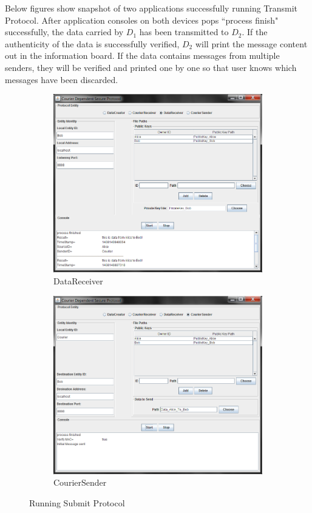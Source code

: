 Below figures show snapshot of two applications successfully running Transmit Protocol. After application consoles on both devices pops ``process finish" successfully, the data carried by $ D_1 $ has been transmitted to $ D_2 $. If the authenticity of the data is successfully verified, $ D_2 $ will print the message content out in the information board. If the data contains messages from multiple senders, they will be verified and printed one by one so that user knows which messages have been discarded.

\begin{figure}[!h]
 \centering
 \begin{subfigure}[b]{0.49\textwidth}
  \includegraphics[width=\textwidth,natwidth=818,natheight=697]{figures/GUIdatareceiver.png}
  \caption{DataReceiver}
 \end{subfigure}
 \begin{subfigure}[b]{0.49\textwidth}
  \includegraphics[width=\textwidth,natwidth=817,natheight=698]{figures/GUIcouriersender.png}
  \caption{CourierSender}
 \end{subfigure}
 \caption{Running Submit Protocol} 
\end{figure}

